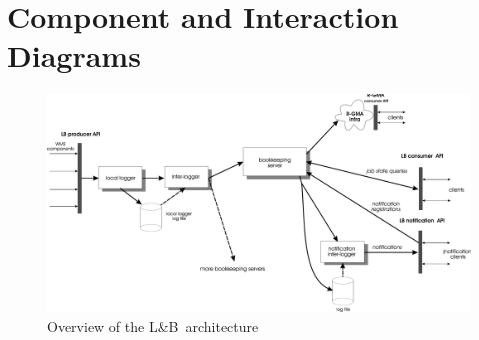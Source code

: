\documentclass{egee}
\def\LB{L\&B}
\def\todo#1{\par\textbf{TODO:} #1\par}
\begin{document}
\clearpage

\appendix

\section{Component and Interaction Diagrams}


\begin{figure}[h]
\centering
\includegraphics[width=.8\hsize]{logging-arch-notif}
\caption{Overview of the \LB\ architecture}
\label{fig-arch}
\end{figure}
\end{document}
